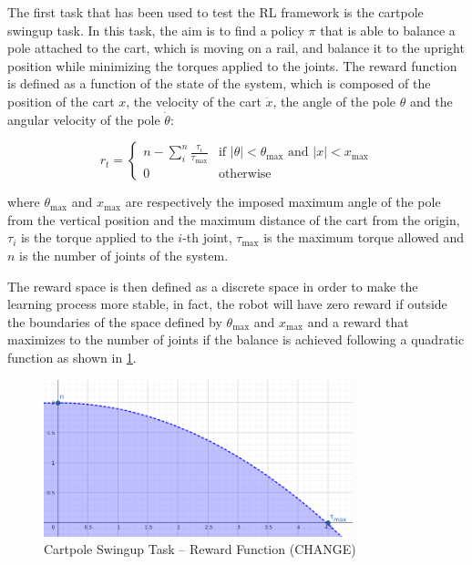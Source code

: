 The first task that has been used to test the \ac{RL} framework is the cartpole swingup task. In this task, the aim is to find a policy $\pi$ that is able to balance a pole attached to the cart, which is moving on a rail, and balance it to the upright position while minimizing the torques applied to the joints. The reward function is defined as a function of the state of the system, which is composed of the position of the cart $x$, the velocity of the cart $\dot{x}$, the angle of the pole $\theta$ and the angular velocity of the pole $\dot{\theta}$:

\begin{equation}
    r _t = \begin{cases}
        n - \sum _i ^n \frac{\tau _i}{\tau _{\text{max}}} & \text{if } \left| \theta \right| < \theta_{\text{max}} \text{ and } \left| x \right| < x_{\text{max}} \\
        0                                                 & \text{otherwise}
    \end{cases}
\end{equation}

where $\theta_{\text{max}}$ and $x _{\text{max}}$ are respectively the imposed maximum angle of the pole from the vertical position and the maximum distance of the cart from the origin, $\tau _i$ is the torque applied to the $i$-th joint, $\tau _{\text{max}}$ is the maximum torque allowed and $n$ is the number of joints of the system.

The reward space is then defined as a discrete space in order to make the learning process more stable, in fact, the robot will have zero reward if outside the boundaries of the space defined by $\theta_{\text{max}}$ and $x _{\text{max}}$ and a reward that maximizes to the number of joints if the balance is achieved following a quadratic function as shown in \cref{fig:cartpolereward}.

\begin{figure}
    \centering
    \includegraphics[width=0.8\textwidth]{Images/cartpole_reward.png}
    \caption{Cartpole Swingup Task -- Reward Function (CHANGE)}
    \label{fig:cartpolereward}
\end{figure}

